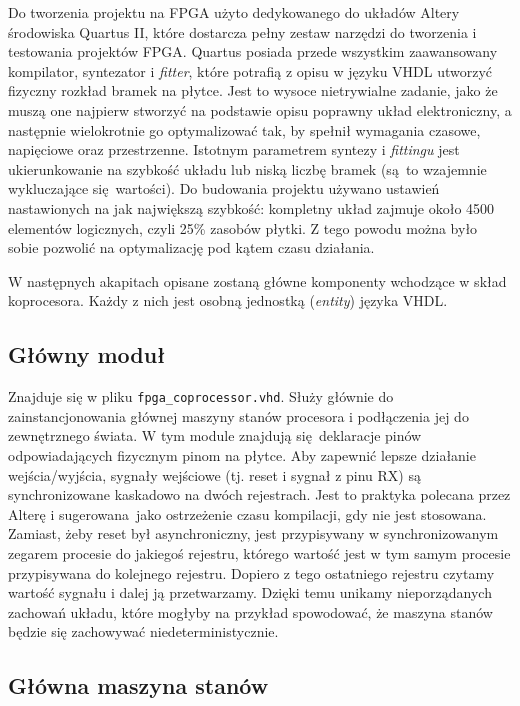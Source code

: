 Do tworzenia projektu na FPGA użyto dedykowanego do układów Altery środowiska Quartus II, które dostarcza pełny zestaw narzędzi do tworzenia i testowania projektów FPGA. Quartus posiada przede wszystkim zaawansowany kompilator, syntezator i \textit{fitter}, które potrafią z opisu w języku VHDL utworzyć fizyczny rozkład bramek na płytce. Jest to wysoce nietrywialne zadanie, jako że muszą one najpierw stworzyć na podstawie opisu poprawny układ elektroniczny, a następnie wielokrotnie go optymalizować tak, by spełnił wymagania czasowe, napięciowe oraz przestrzenne. Istotnym parametrem syntezy i \textit{fittingu} jest ukierunkowanie na szybkość układu lub niską liczbę bramek (są to wzajemnie wykluczające się wartości). Do budowania projektu używano ustawień nastawionych na jak największą szybkość: kompletny układ zajmuje około 4500 elementów logicznych, czyli 25\% zasobów płytki. Z tego powodu można było sobie pozwolić na optymalizację pod kątem czasu działania.

W następnych akapitach opisane zostaną główne komponenty wchodzące w skład koprocesora. Każdy z nich jest osobną jednostką (\textit{entity}) języka VHDL.


\subsection{Główny moduł}

Znajduje się w pliku \texttt{fpga\_coprocessor.vhd}. Służy głównie do zainstancjonowania głównej maszyny stanów procesora i podłączenia jej do zewnętrznego świata. W tym module znajdują się deklaracje pinów odpowiadających fizycznym pinom na płytce. Aby zapewnić lepsze działanie wejścia/wyjścia, sygnały wejściowe (tj. reset i sygnał z pinu RX) są synchronizowane kaskadowo na dwóch rejestrach. Jest to praktyka polecana przez Alterę i sugerowana jako ostrzeżenie czasu kompilacji, gdy nie jest stosowana. Zamiast, żeby reset był asynchroniczny, jest przypisywany w synchronizowanym zegarem procesie do jakiegoś rejestru, którego wartość jest w tym samym procesie przypisywana do kolejnego rejestru. Dopiero z tego ostatniego rejestru czytamy wartość sygnału i dalej ją przetwarzamy. Dzięki temu unikamy nieporządanych zachowań układu, które mogłyby na przykład spowodować, że maszyna stanów będzie się zachowywać niedeterministycznie.


\subsection{Główna maszyna stanów}

